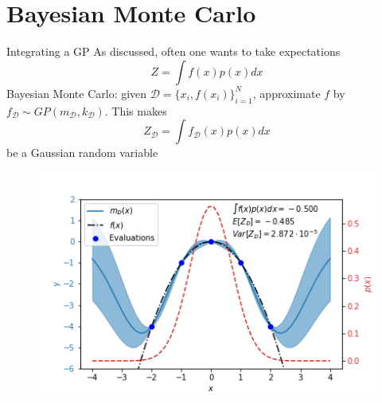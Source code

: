 \documentclass{beamer}
\begin{document}
\section{Bayesian Monte Carlo}
\begin{frame}{}
\begin{block}{Integrating a GP}
As discussed, often one wants to take expectations
\begin{equation*}
Z = \int f(x) p(x) dx
\end{equation*}
Bayesian Monte Carlo: given $\mathcal{D} = \{x_i,f(x_i)\}_{i=1}^N$, approximate $f$ by $f_\mathcal{D} \sim GP(m_\mathcal{D},k_\mathcal{D})$. This makes
\begin{equation*}
Z_\mathcal{D} = \int f_\mathcal{D}(x) p(x) dx
\end{equation*}
be a Gaussian random variable

\begin{block}{}

\end{block}
\end{block}
\end{frame}
\begin{frame}{}
\begin{figure}
\centering
\includegraphics[width=0.8\linewidth]{figs/exbmc.png}
\end{figure}
\end{frame}
\end{document}
